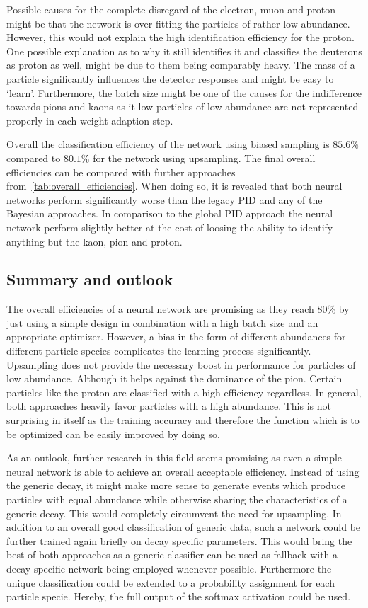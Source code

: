 Possible causes for the complete disregard of the electron, muon and proton might be that the network is over-fitting the particles of rather low abundance. However, this would not explain the high identification efficiency for the proton. One possible explanation as to why it still identifies it and classifies the deuterons as proton as well, might be due to them being comparably heavy. The mass of a particle significantly influences the detector responses and might be easy to `learn'.
Furthermore, the batch size might be one of the causes for the indifference towards pions and kaons as it low particles of low abundance are not represented properly in each weight adaption step.

Overall the classification efficiency of the network using biased sampling is $85.6 \%$ compared to $80.1 \%$ for the network using upsampling. The final overall efficiencies can be compared with further approaches from~\autoref{tab:overall_efficiencies}. When doing so, it is revealed that both neural networks perform significantly worse than the legacy PID and any of the Bayesian approaches. In comparison to the global PID approach the neural network perform slightly better at the cost of loosing the ability to identify anything but the kaon, pion and proton.

\subsection{Summary and outlook}
\label{subsc:neural_network_summary}

The overall efficiencies of a neural network are promising as they reach $80 \%$ by just using a simple design in combination with a high batch size and an appropriate optimizer. However, a bias in the form of different abundances for different particle species complicates the learning process significantly. Upsampling does not provide the necessary boost in performance for particles of low abundance. Although it helps against the dominance of the pion. Certain particles like the proton are classified with a high efficiency regardless. In general, both approaches heavily favor particles with a high abundance. This is not surprising in itself as the training accuracy and therefore the function which is to be optimized can be easily improved by doing so.

As an outlook, further research in this field seems promising as even a simple neural network is able to achieve an overall acceptable efficiency. Instead of using the generic decay, it might make more sense to generate events which produce particles with equal abundance while otherwise sharing the characteristics of a generic decay. This would completely circumvent the need for upsampling. In addition to an overall good classification of generic data, such a network could be further trained again briefly on decay specific parameters. This would bring the best of both approaches as a generic classifier can be used as fallback with a decay specific network being employed whenever possible. Furthermore the unique classification could be extended to a probability assignment for each particle specie. Hereby, the full output of the softmax activation could be used.
